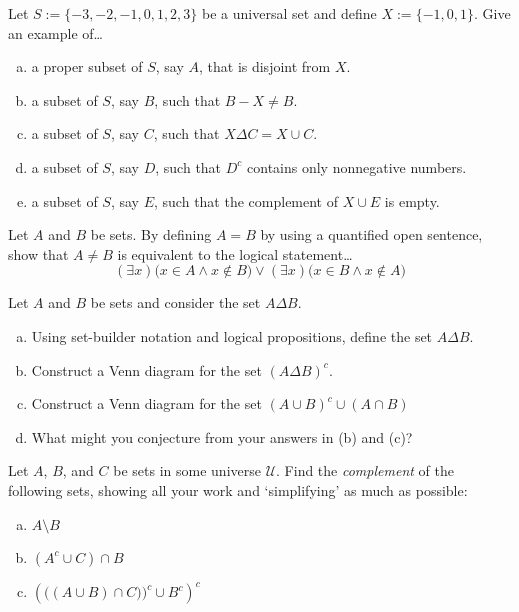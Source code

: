 \documentclass[11pt,letterpaper]{article}
\begin{document}

 Let $S:= \{ -3, -2, -1, 0, 1, 2, 3 \}$ be a universal set and define $X:= \{ -1, 0, 1 \}$. Give an example of\dots
	\begin{enumerate}[(a)]
	\item a proper subset of $S$, say $A$, that is disjoint from $X$.
	\item a subset of $S$, say $B$, such that $B - X \neq B$.
	\item a subset of $S$, say $C$, such that $X \Delta C= X \cup C$.
	\item a subset of $S$, say $D$, such that $D^c$ contains only nonnegative numbers.
	\item a subset of $S$, say $E$, such that the complement of $X \cup E$ is empty. 
	\end{enumerate}



\newpage



 Let $A$ and $B$ be sets. By defining $A= B$ by using a quantified open sentence, show that $A \neq B$ is equivalent to the logical statement\dots
	\[
	(\exists x) \big( x \in A \wedge x \notin B \big) \vee (\exists x) \big( x \in B \wedge x \notin A \big)
	\]



\newpage



 Let $A$ and $B$ be sets and consider the set $A \Delta B$. 
	\begin{enumerate}[(a)]
	\item Using set-builder notation and logical propositions, define the set $A \Delta B$.
	\item Construct a Venn diagram for the set $(A \Delta B)^c$.
	\item Construct a Venn diagram for the set $(A \cup B)^c \cup (A \cap B)$
	\item What might you conjecture from your answers in (b) and (c)?
	\end{enumerate}



\newpage



 Let $A$, $B$, and $C$ be sets in some universe $\mathcal{U}$. Find the \textit{complement} of the following sets, showing all your work and `simplifying' as much as possible:
	\begin{enumerate}[(a)]
	\item $A \setminus B$
	\item $(A^c \cup C) \cap B$
	\item $\left( \big( (A \cup B) \cap C) \big)^c \cup B^c \right)^c$
	\end{enumerate}
\end{document}
